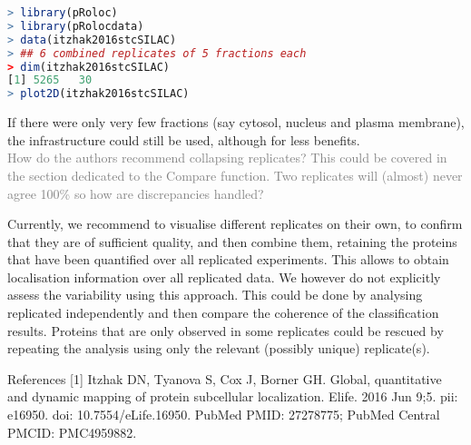 \documentclass[11pt]{article}
\begin{document}
\small{
\begin{lstlisting}[language=R] 
> library(pRoloc)
> library(pRolocdata)
> data(itzhak2016stcSILAC)
> ## 6 combined replicates of 5 fractions each
> dim(itzhak2016stcSILAC)
[1] 5265   30
> plot2D(itzhak2016stcSILAC)
\end{lstlisting}}

If there were only very few fractions (say cytosol, nucleus and plasma membrane), the infrastructure could still be used, although for less benefits. \\


\textcolor{gray} {How do the authors recommend collapsing replicates? This could be covered in the section dedicated to the Compare function. Two replicates will (almost) never agree 100\% so how are discrepancies handled?}

Currently, we recommend to visualise different replicates on their own, to confirm that they are of sufficient quality, and then combine them, retaining the proteins that have been quantified over all replicated experiments. This allows to obtain localisation information over all replicated data. We however do not explicitly assess the variability using this approach. This could be done by analysing replicated independently and then compare the coherence of the classification results. Proteins that are only observed in some replicates could be rescued by repeating the analysis using only the relevant (possibly unique) replicate(s). \\ \newline


\small{References
[1] Itzhak DN, Tyanova S, Cox J, Borner GH. Global, quantitative and dynamic mapping of protein subcellular localization. Elife. 2016 Jun 9;5. pii: e16950.  doi: 10.7554/eLife.16950. PubMed PMID: 27278775; PubMed Central PMCID: PMC4959882.}
\end{document}

